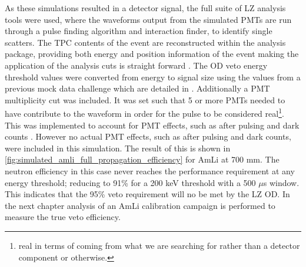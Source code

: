 \par
As these simulations resulted in a detector signal, the full suite of LZ analysis tools were used, where the waveforms output from the simulated PMTs are run through a pulse finding algorithm and interaction finder, to identify single scatters.
The TPC contents of the event are reconstructed within the analysis package, providing both energy and position information of the event making the application of the analysis cuts is straight forward \cite{lz_simulations_ref}.
The OD veto energy threshold values were converted from energy to signal size using the values from a previous mock data challenge which are detailed in \cite{jonathannikoleyczik_thesis_ref}.
Additionally a PMT multiplicity cut was included.
It was set such that 5 or more PMTs needed to have contribute to the waveform in order for the pulse to be considered real\footnote{real in terms of coming from what we are searching for rather than a detector component or otherwise.}.
This was implemented to account for PMT effects, such as after pulsing and dark counts \cite{jonathannikoleyczik_thesis_ref}.
However no actual PMT effects, such as after pulsing and dark counts, were included in this simulation.
The result of this is shown in \autoref{fig:simulated_amli_full_propagation_efficiency} for AmLi at 700 mm. 
The neutron efficiency in this case never reaches the performance requirement at any energy threshold; reducing to 91\% for a 200 keV threshold with a 500 $\mu$s window.
This indicates that the 95\% veto requirement will no be met by the LZ OD.
In the next chapter analysis of an AmLi calibration campaign is performed to measure the true veto efficiency.

